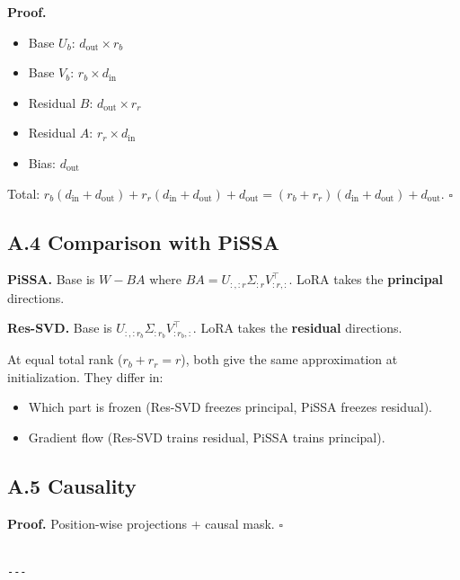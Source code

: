 \textbf{Proof.}
\begin{itemize}
\item Base $U_b$: $d_\text{out} \times r_b$
\item Base $V_b$: $r_b \times d_\text{in}$
\item Residual $B$: $d_\text{out} \times r_r$
\item Residual $A$: $r_r \times d_\text{in}$
\item Bias: $d_\text{out}$

\end{itemize}
Total: $r_b(d_\text{in} + d_\text{out}) + r_r(d_\text{in} + d_\text{out}) + d_\text{out} = (r_b + r_r)(d_\text{in} + d_\text{out}) + d_\text{out}$. $\square$

\subsection{A.4 Comparison with PiSSA}

\textbf{PiSSA.} Base is $W - BA$ where $BA = U_{:, :r} \Sigma_{:r} V_{:r, :}^\top$. 
LoRA takes the \textbf{principal} directions.

\textbf{Res-SVD.} Base is $U_{:, :r_b} \Sigma_{:r_b} V_{:r_b, :}^\top$. LoRA 
takes the \textbf{residual} directions.

At equal total rank ($r_b + r_r = r$), both give the same approximation 
at initialization. They differ in:
\begin{itemize}
\item Which part is frozen (Res-SVD freezes principal, PiSSA freezes residual).
\item Gradient flow (Res-SVD trains residual, PiSSA trains principal).

\end{itemize}
\subsection{A.5 Causality}

\textbf{Proof.} Position-wise projections + causal mask. $\square$
\begin{lstlisting}

---
\end{lstlisting}